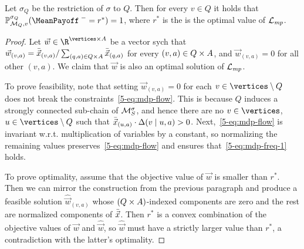 \begin{theorem}
\label{5-cor:mp-scc-optimality}
Let $\sigma_Q$ be the restriction of $\sigma$ to $Q$. Then for every $v\in Q$ it holds that $\probm^{\sigma_Q}_{\mdp_Q,v}(\MeanPayoffInf = r^*)=1$, where $r^*$ is the is the optimal value of $\mathcal{L}_{\mathit{mp}}$. 
\end{theorem}
\begin{proof}
Let $ \vec{w}\in\R^{\vertices \times\actions} $ be a vector sych that $\vec{w}_{(v,a)}=\bar{\vec{x}}_{(v,a)}/\sum_{(q,a)\in Q\times A} \bar{\vec{x}}_{(q,a)}$ for every $(v,a)\in Q\times A$, and $\vec{w}_{(v,a)}=0$ for all other $(v,a)$. We claim that $ \vec{w} $ is also an optimal solution of $\mathcal{L}_{\mathit{mp}}$. 

To prove feasibility, note that setting $\vec{w}_{(v,a)}=0$ for each $v\in \vertices\setminus Q$ does not break the constraints~\eqref{5-eq:mdp-flow}. This is because $Q$ induces a strongly connected sub-chain of $\mathcal{M}_{S}^{\sigma}$, and hence there are no $v\in \vertices$, $u\in \vertices\setminus Q$ such that $\bar{\vec{x}}_{(u,a)}\cdot \Delta(v\mid u,a)>0$. Next,~\eqref{5-eq:mdp-flow} is invariant w.r.t. multiplication of variables by a constant, so normalizing the remaining values preserves~\eqref{5-eq:mdp-flow} and ensures that~\eqref{5-eq:mdp-freq-1} holds. 

To prove optimality, assume that the objective value of $\vec{w}$ is smaller than $r^*$. Then we can mirror the construction from the previous paragraph and produce a feasible solution ${\hat{\vec{w}}_{(v,a)}}$ whose $(Q\times A)$-indexed components are zero and the rest are normalized components of $\bar{\vec{x}}$. Then $r^*$ is a convex combination of the objective values of $\vec{w}$ and $\hat{\vec{w}}$, so $\hat{\vec{w}}$ must have a strictly larger value than $r^*$, a contradiction with the latter's optimality.


\end{proof}
